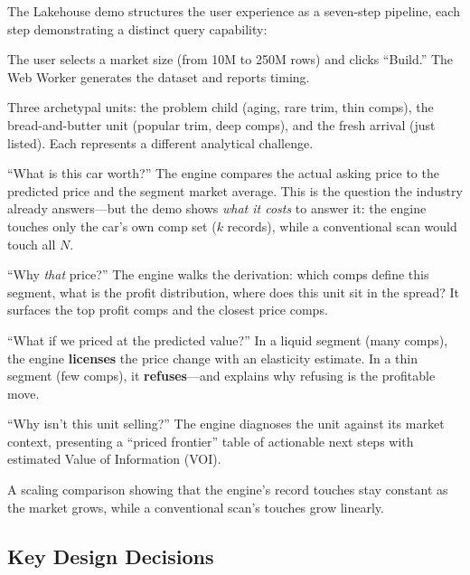 \documentclass[11pt,a4paper,twoside]{book}
\begin{document}
The Lakehouse demo structures the user experience as a seven-step pipeline, each step
demonstrating a distinct query capability:

\begin{description}[leftmargin=*,font=\normalfont\bfseries]
    \item[Step 1: Build the Market.] The user selects a market size (from 10M to 250M rows) and
          clicks ``Build.'' The Web Worker generates the dataset and reports timing.
    \item[Step 2: Pick a Car.] Three archetypal units: the problem child (aging, rare trim, thin
          comps), the bread-and-butter unit (popular trim, deep comps), and the fresh arrival
          (just listed). Each represents a different analytical challenge.
    \item[Step 3: Forward Query.] ``What is this car worth?'' The engine compares the actual
          asking price to the predicted price and the segment market average. This is the question
          the industry already answers---but the demo shows \textit{what it costs} to answer it:
          the engine touches only the car's own comp set ($k$ records), while a conventional scan
          would touch all $N$.
    \item[Step 4: Backward Query.] ``Why \textit{that} price?'' The engine walks the derivation:
          which comps define this segment, what is the profit distribution, where does this unit
          sit in the spread? It surfaces the top profit comps and the closest price comps.
    \item[Step 5: Counterfactual.] ``What if we priced at the predicted value?'' In a liquid
          segment (many comps), the engine \textbf{licenses} the price change with an elasticity
          estimate. In a thin segment (few comps), it \textbf{refuses}---and explains why refusing
          is the profitable move.
    \item[Step 6: Abductive Query.] ``Why isn't this unit selling?'' The engine diagnoses the
          unit against its market context, presenting a ``priced frontier'' table of actionable
          next steps with estimated Value of Information (VOI).
    \item[Step 7: Benchmark.] A scaling comparison showing that the engine's record touches stay
          constant as the market grows, while a conventional scan's touches grow linearly.
\end{description}

\subsection{Key Design Decisions}
\end{document}
